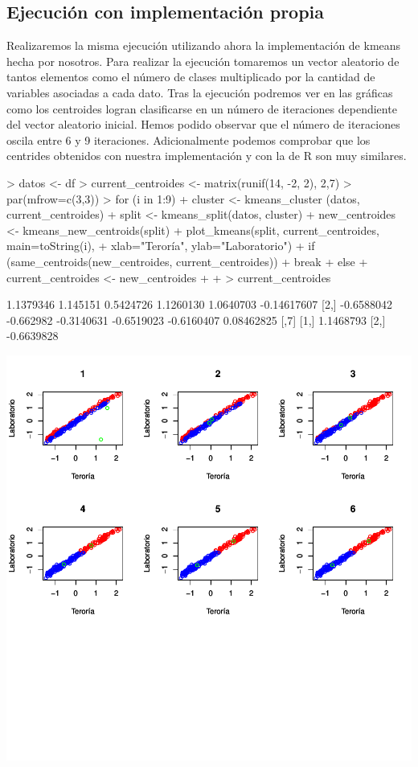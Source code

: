 \documentclass [a4paper] {article}
\begin{document}
\subsection{Ejecución con implementación propia}
Realizaremos la misma ejecución utilizando ahora la implementación de kmeans hecha por nosotros.
Para realizar la ejecución tomaremos un vector aleatorio de tantos elementos como el número de clases multiplicado por la cantidad de variables asociadas a cada dato.
Tras la ejecución podremos ver en las gráficas como los centroides logran clasificarse en un número de iteraciones dependiente del vector aleatorio inicial.
Hemos podido observar que el número de iteraciones oscila entre 6 y 9 iteraciones.
Adicionalmente podemos comprobar que los centrides obtenidos con nuestra implementación y con la de R son muy similares.
\begin{center}
\begin{Schunk}
\begin{Sinput}
> datos <- df
> current_centroides <- matrix(runif(14, -2, 2), 2,7)
> par(mfrow=c(3,3))
> for (i in 1:9){
+   cluster <- kmeans_cluster (datos, current_centroides)
+   split <- kmeans_split(datos, cluster)
+   new_centroides <- kmeans_new_centroids(split)
+   plot_kmeans(split, current_centroides, main=toString(i),
+               xlab="Teroría", ylab="Laboratorio")
+   if (same_centroids(new_centroides, current_centroides)){
+     break
+   }else{
+     current_centroides <- new_centroides
+   }
+ }
> current_centroides
\end{Sinput}
\begin{Soutput}
           [,1]      [,2]       [,3]       [,4]       [,5]        [,6]
[1,]  1.1379346  1.145151  0.5424726  1.1260130  1.0640703 -0.14617607
[2,] -0.6588042 -0.662982 -0.3140631 -0.6519023 -0.6160407  0.08462825
           [,7]
[1,]  1.1468793
[2,] -0.6639828
\end{Soutput}
\end{Schunk}
\includegraphics{entrega-kmeans_our_implementation}
\end{center}
\end{document}
